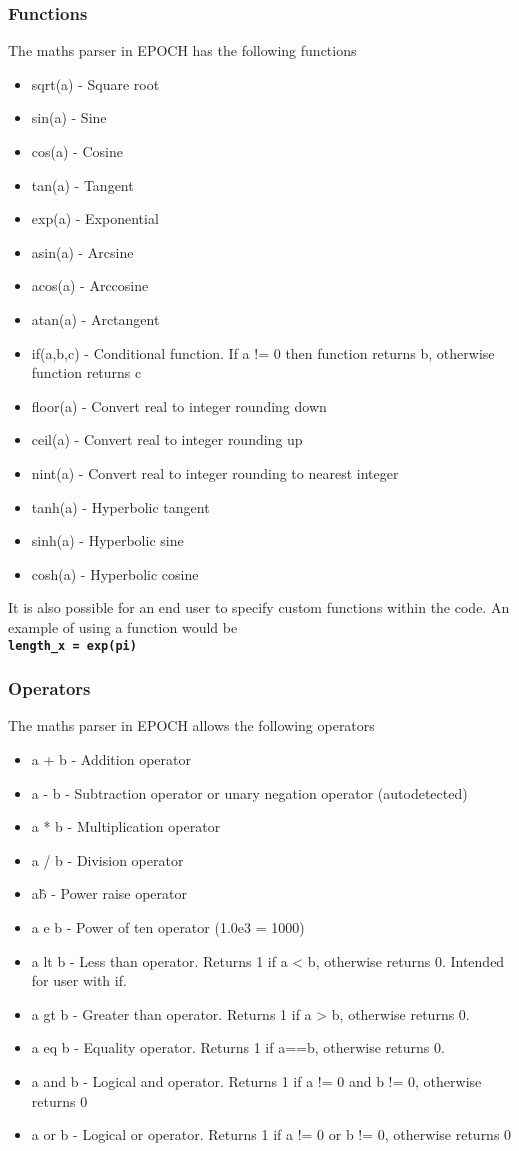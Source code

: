 \documentclass[12pt]{article}
\newcommand{\inlinecode}[1]{{\color{warwickred} \bf\texttt{#1}}}
\newcommand{\nEPOCH}{{\color{warwickdark}\fontfamily{phv}\selectfont EPOCH}}
\newcommand{\EPOCH}{{\nEPOCH} }
\begin{document}
\subsubsection{Functions}
The maths parser in \EPOCH has the following functions
\begin{itemize}
\item sqrt(a) - Square root
\item sin(a) - Sine
\item cos(a) - Cosine
\item tan(a) - Tangent
\item exp(a) - Exponential
\item asin(a) - Arcsine
\item acos(a) - Arccosine
\item atan(a) - Arctangent
\item if(a,b,c) - Conditional function. If a != 0 then function returns b,
  otherwise function returns c
\item floor(a) - Convert real to integer rounding down
\item ceil(a) - Convert real to integer rounding up
\item nint(a) - Convert real to integer rounding to nearest integer
\item tanh(a) - Hyperbolic tangent
\item sinh(a) - Hyperbolic sine
\item cosh(a) - Hyperbolic cosine
\end{itemize}

It is also possible for an end user to specify custom functions within the
code. An example of using a function would be\\
\inlinecode{length\_x = exp(pi)}\\

\subsubsection{Operators}
The maths parser in \EPOCH allows the following operators
\begin{itemize}
\item a + b - Addition operator
\item a - b - Subtraction operator or unary negation operator (autodetected)
\item a * b - Multiplication operator
\item a / b - Division operator
\item a\^b - Power raise operator
\item a e b - Power of ten operator (1.0e3 = 1000)
\item a lt b - Less than operator. Returns 1 if a < b, otherwise returns
  0. Intended for user with if.
\item a gt b - Greater than operator. Returns 1 if a > b, otherwise returns 0.
\item a eq b - Equality operator. Returns 1 if a==b, otherwise returns 0.
\item a and b - Logical and operator. Returns 1 if a != 0 and b != 0,
  otherwise returns 0
\item a or b - Logical or operator. Returns 1 if a != 0 or b != 0, otherwise
  returns 0
\end{itemize}
\end{document}
